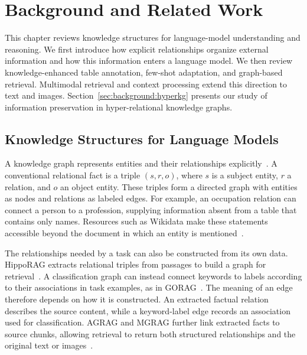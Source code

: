 \chapter{Background and Related Work}
\label{ch:background}

This chapter reviews knowledge structures for language-model understanding and reasoning. We first introduce how explicit relationships organize external information and how this information enters a language model. We then review knowledge-enhanced table annotation, few-shot adaptation, and graph-based retrieval. Multimodal retrieval and context processing extend this direction to text and images. Section~\ref{sec:background:hyperkg} presents our study of information preservation in hyper-relational knowledge graphs.

\section{Knowledge Structures for Language Models}
\label{sec:background:knowledge-models}

A knowledge graph represents entities and their relationships explicitly~\cite{bg-ji2022kg}. A conventional relational fact is a triple $(s,r,o)$, where $s$ is a subject entity, $r$ a relation, and $o$ an object entity. These triples form a directed graph with entities as nodes and relations as labeled edges. For example, an occupation relation can connect a person to a profession, supplying information absent from a table that contains only names. Resources such as Wikidata make these statements accessible beyond the document in which an entity is mentioned~\cite{bg-wikidata}.

The relationships needed by a task can also be constructed from its own data. HippoRAG extracts relational triples from passages to build a graph for retrieval~\cite{bg-hipporag}. A classification graph can instead connect keywords to labels according to their associations in task examples, as in GORAG~\cite{bg-gorag}. The meaning of an edge therefore depends on how it is constructed. An extracted factual relation describes the source content, while a keyword-label edge records an association used for classification. AGRAG and MGRAG further link extracted facts to source chunks, allowing retrieval to return both structured relationships and the original text or images~\cite{bg-agrag,bg-mgrag}.

